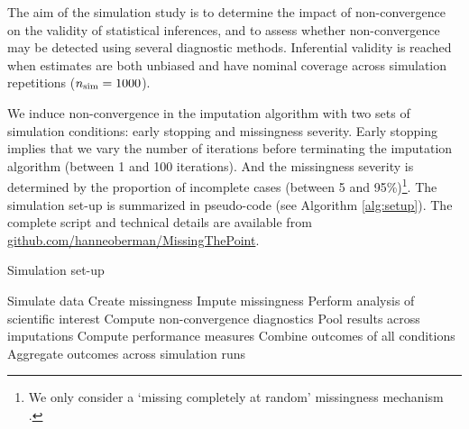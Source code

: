\documentclass{article}
\begin{document}
The aim of the simulation study is to determine the impact of non-convergence on the validity of statistical inferences, and to assess whether non-convergence may be detected using several diagnostic methods. Inferential validity is reached when estimates are both unbiased and have nominal coverage across simulation repetitions ($n_{\rm sim}=1000$).

We induce non-convergence in the imputation algorithm with two sets of simulation conditions: early stopping and missingness severity. Early stopping implies that we vary the number of iterations before terminating the imputation algorithm (between 1 and 100 iterations). And the missingness severity is determined by the proportion of incomplete cases (between 5 and 95\%)\footnote{We only consider a `missing completely at random' missingness mechanism \citep{rubin76}.}. The simulation set-up is summarized in pseudo-code (see Algorithm \ref{alg:setup}). The complete script and technical details are available from \href{https://github.com/hanneoberman/MissingThePoint}{github.com/hanneoberman/MissingThePoint}. 

\begin{algorithm}
   \caption{Simulation set-up}
   \label{alg:setup}
\begin{algorithmic}
\STATE Simulate data 
\REPEAT 
  \STATE Create missingness
   \STATE Impute missingness
   \STATE Perform analysis of scientific interest
   \STATE Compute non-convergence diagnostics 
   \STATE Pool results across imputations
   \STATE Compute performance measures
   \ENDFOR
 \ENDFOR 
 \STATE Combine outcomes of all conditions
\STATE Aggregate outcomes across simulation runs
\end{algorithmic}
\end{algorithm}


% 
% 
% 
% 
% 
\end{document}
